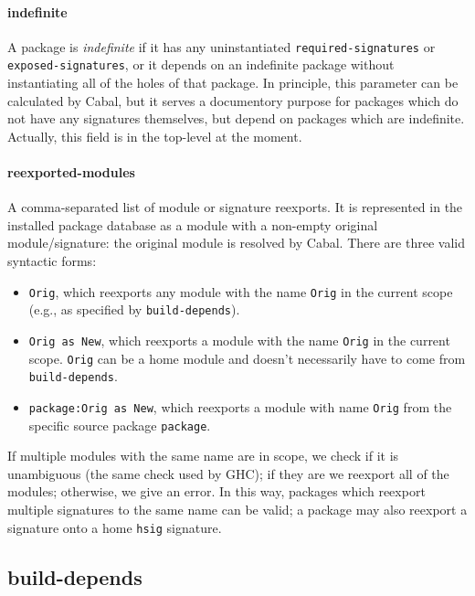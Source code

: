 \documentclass{article}
\newcommand{\Red}[1]{{\color{red} #1}}
\begin{document}
\paragraph{indefinite}  A package is \emph{indefinite} if it has any
uninstantiated
\texttt{required-signatures} or \texttt{exposed-signatures}, or it
depends on an indefinite package without instantiating all of the holes
of that package.  In principle, this parameter can be calculated
by Cabal, but it serves a documentory purpose for packages which do not
have any signatures themselves, but depend on packages which are indefinite.
\Red{Actually, this field is in the top-level at the moment.}

\paragraph{reexported-modules}  A comma-separated list of module or
signature reexports.  It is represented in the installed package
database as a module with a non-empty original module/signature: the
original module is resolved by Cabal.  There are three valid syntactic
forms:

\begin{itemize}
    \item \texttt{Orig}, which reexports any module with the
    name \texttt{Orig} in the current scope (e.g.,
    as specified by \texttt{build-depends}).

    \item \texttt{Orig as New}, which reexports a module with
    the name \texttt{Orig} in the current scope.  \texttt{Orig}
    can be a home module and doesn't necessarily have to come
    from \texttt{build-depends}.

    \item \texttt{package:Orig as New}, which reexports a module
    with name \texttt{Orig} from the specific source package \texttt{package}.
\end{itemize}

If multiple modules with the same name are in scope, we check
if it is unambiguous (the same check used by GHC); if they are
we reexport all of the modules; otherwise, we give an error.
In this way, packages which reexport multiple signatures to the
same name can be valid; a package may also reexport a signature
onto a home \texttt{hsig} signature.

\subsection{build-depends}
\end{document}
